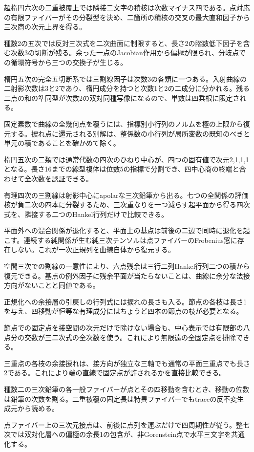 \documentclass[11pt,a4paper]{ltjsarticle}
\begin{document}
超楕円六次の二重被覆上では隣接二文字の積核は次数マイナス四である。点対応の有限ファイバーがその分裂型を決め、二箇所の積核の交叉の最大直和因子から三次商の次元上界を得る。

種数2の五次では反対三次式を二次曲面に制限すると、長さ2の階数低下因子を含む次数3の切断が残る。余った一点のJacobian作用から偏極が限られ、分岐点での循環符号から三つの交換子が生じる。

楕円五次の完全五切断系では三割線因子は次数3の各類に一つある。入射曲線の二射影次数は3と2であり、楕円成分を持つと次数1と2の二成分に分かれる。残る二点の和の準同型が次数2の双対同種写像になるので、単数は四乗根に限定される。

固定素数で曲線の全幾何点を覆うには、指標別小行列のノルムを極の上限から復元する。捩れ点に還元される別解は、整係数の小行列が局所変数の既知のべきと単元の積であることを確かめて除く。

楕円五次の二類では通常代数の四次のひねり中心が、四つの固有値で次元2,1,1,1となる。長さ16までの線型複体は位数5の指標で分割でき、四中心商の終端と合わせて全次数を認証できる。

有理四次の三割線は射影中心にapolarな三次鉛筆から出る。七つの全関係の評価核が負二次の四本に分裂するため、三次重なりを一つ減らす超平面から得る四次式を、隣接する二つのHankel行列だけで比較できる。

平面外への混合関係が退化すると、平面上の基点は前後の二辺で同時に退化を起こす。連続する純関係が生む純三次テンソルは点ファイバーのFrobenius窓に存在しない。これが一次正規列を曲線自体から復元する。

空間三次での割線の一意性により、六点残余は三行二列Hankel行列二つの積から復元できる。基点の例外因子に残余平面が当たらないことは、曲線に余分な法接方向がないことと同値である。

正規化への余接層の引戻しの行列式には捩れの長さも入る。節点の各枝は長さ1を与え、四移動が恒等な有理成分にはちょうど四本の節点の枝が必要となる。

節点での固定点を接空間の次元だけで除けない場合も、中心表示では有限部の八点分の交数が三二次式の全次数を使う。これにより無限遠の全固定点を排除できる。

三重点の各枝の余接捩れは、接方向が独立な三軸でも通常の平面三重点でも長さ2である。これにより端の直線で固定点が許されるかを直接比較できる。

種数二の三次鉛筆の各一般ファイバーが点とその四移動を含むとき、移動の位数は鉛筆の次数を割る。二重被覆の固定長は特異ファイバーでもtraceの反不変生成元から読める。

点ファイバー上の三次元接点は、前後に点列を運ぶだけで四周期性が従う。整七次では双対化層への偏極の余長1の包含が、非Gorenstein点で水平三文字を共通化する。
\end{document}
